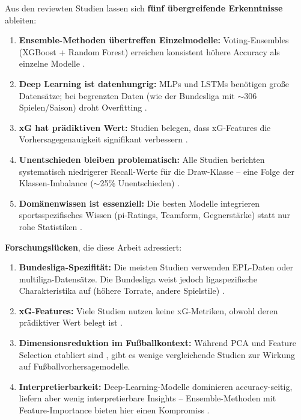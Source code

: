 Aus den reviewten Studien lassen sich \textbf{fünf übergreifende Erkenntnisse} ableiten:
\begin{enumerate}
    \item \textbf{Ensemble-Methoden übertreffen Einzelmodelle:} Voting-Ensembles (XGBoost + Random Forest) erreichen konsistent höhere Accuracy als einzelne Modelle \cite{MillsEtAl2024,HubacekSourekZelezny2019}.
    \item \textbf{Deep Learning ist datenhungrig:} MLPs und LSTMs benötigen große Datensätze; bei begrenzten Daten (wie der Bundesliga mit $\sim$306 Spielen/Saison) droht Overfitting \cite{Sumpter2016,GoodfellowEtAl2016}.
    \item \textbf{xG hat prädiktiven Wert:} Studien belegen, dass xG-Features die Vorhersagegenauigkeit signifikant verbessern \cite{AnzerBauer2021,ForcherEtAl2025,VanEetveldeEtAl2024}.
    \item \textbf{Unentschieden bleiben problematisch:} Alle Studien berichten systematisch niedrigerer Recall-Werte für die Draw-Klasse -- eine Folge der Klassen-Imbalance ($\sim$25\% Unentschieden) \cite{HeGarcia2009,BunkerThabtah2019}.
    \item \textbf{Domänenwissen ist essenziell:} Die besten Modelle integrieren sportsspezifisches Wissen (pi-Ratings, Teamform, Gegnerstärke) statt nur rohe Statistiken \cite{YeungEtAl2024,Constantinou2018}.
\end{enumerate}

\textbf{Forschungslücken}, die diese Arbeit adressiert:
\begin{enumerate}
    \item \textbf{Bundesliga-Spezifität:} Die meisten Studien verwenden EPL-Daten oder multiliga-Datensätze. Die Bundesliga weist jedoch ligaspezifische Charakteristika auf (höhere Torrate, andere Spielstile) \cite{Wheatcroft2022}.
    \item \textbf{xG-Features:} Viele Studien nutzen keine xG-Metriken, obwohl deren prädiktiver Wert belegt ist \cite{AnzerBauer2021,VanEetveldeEtAl2024}.
    \item \textbf{Dimensionsreduktion im Fußballkontext:} Während PCA und Feature Selection etabliert sind \cite{JamesEtAl2021}, gibt es wenige vergleichende Studien zur Wirkung auf Fußballvorhersagemodelle.
    \item \textbf{Interpretierbarkeit:} Deep-Learning-Modelle dominieren accuracy-seitig, liefern aber wenig interpretierbare Insights -- Ensemble-Methoden mit Feature-Importance bieten hier einen Kompromiss \cite{Breiman2001,LundbergLee2017}.
\end{enumerate}

